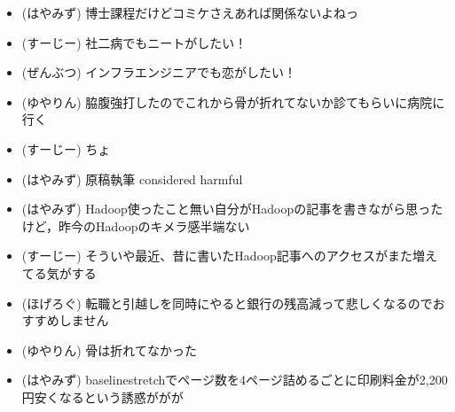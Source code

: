 
%
%

\begin{itemize}
 \item (はやみず) 博士課程だけどコミケさえあれば関係ないよねっ
 \item (すーじー) 社二病でもニートがしたい！
 \item (ぜんぶつ) インフラエンジニアでも恋がしたい！
 \item (ゆやりん) 脇腹強打したのでこれから骨が折れてないか診てもらいに病院に行く
 \item (すーじー) ちょ
 \item (はやみず) 原稿執筆 considered harmful
 \item (はやみず) Hadoop使ったこと無い自分がHadoopの記事を書きながら思ったけど，昨今のHadoopのキメラ感半端ない
 \item (すーじー) そういや最近、昔に書いたHadoop記事へのアクセスがまた増えてる気がする
 \item (ほげろぐ) 転職と引越しを同時にやると銀行の残高減って悲しくなるのでおすすめしません
 \item (ゆやりん) 骨は折れてなかった
 \item (はやみず) baselinestretchでページ数を4ページ詰めるごとに印刷料金が2,200円安くなるという誘惑ががが
\end{itemize}
